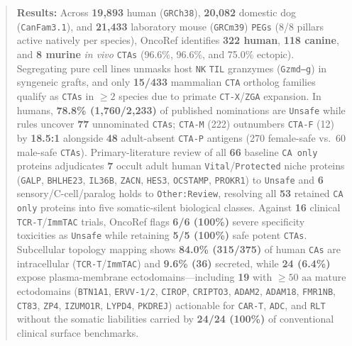 \documentclass[10pt,letterpaper]{article}
\begin{document}
\begin{abstract}
\textbf{Results:} Across \textbf{19,893} human (\texttt{GRCh38}), \textbf{20,082} domestic dog (\texttt{CanFam3.1}), and \textbf{21,433} laboratory mouse (\texttt{GRCm39}) \texttt{PEGs} (8/8 pillars active natively per species), OncoRef identifies \textbf{322 human}, \textbf{118 canine}, and \textbf{8 murine} \emph{in vivo} \texttt{CTAs} (96.6\%, 96.6\%, and 75.0\% ectopic). Segregating pure cell lines unmasks host \texttt{NK} \texttt{TIL} granzymes (\texttt{Gzmd--g}) in syngeneic grafts, and only \textbf{15/433} mammalian \texttt{CTA} ortholog families qualify as \texttt{CTAs} in $\ge 2$ species due to primate \texttt{CT-X}/\texttt{ZGA} expansion. In humans, \textbf{78.8\% (1,760/2,233)} of published nominations are \texttt{Unsafe} while rules uncover \textbf{77} unnominated \texttt{CTAs}; \texttt{CTA-M} (222) outnumbers \texttt{CTA-F} (12) by \textbf{18.5:1} alongside \textbf{48} adult-absent \texttt{CTA-P} antigens (270 female-safe vs.\ 60 male-safe \texttt{CTAs}). Primary-literature review of all \textbf{66} baseline \texttt{CA only} proteins adjudicates \textbf{7} occult adult human \texttt{Vital}/\texttt{Protected} niche proteins (\texttt{GALP}, \texttt{BHLHE23}, \texttt{IL36B}, \texttt{ZACN}, \texttt{HES3}, \texttt{OCSTAMP}, \texttt{PROKR1}) to \texttt{Unsafe} and \textbf{6} sensory/C-cell/paralog holds to \texttt{Other:Review}, resolving all \textbf{53} retained \texttt{CA only} proteins into five somatic-silent biological classes. Against \textbf{16} clinical \texttt{TCR-T}/\texttt{ImmTAC} trials, OncoRef flags \textbf{6/6 (100\%)} severe specificity toxicities as \texttt{Unsafe} while retaining \textbf{5/5 (100\%)} safe potent \texttt{CTAs}. Subcellular topology mapping shows \textbf{84.0\% (315/375)} of human \texttt{CAs} are intracellular (\texttt{TCR-T}/\texttt{ImmTAC}) and \textbf{9.6\% (36)} secreted, while \textbf{24 (6.4\%)} expose plasma-membrane ectodomains---including \textbf{19} with $\ge 50\text{ aa}$ mature ectodomains (\texttt{BTN1A1}, \texttt{ERVV-1/2}, \texttt{CIROP}, \texttt{CRIPTO3}, \texttt{ADAM2}, \texttt{ADAM18}, \texttt{FMR1NB}, \texttt{CT83}, \texttt{ZP4}, \texttt{IZUMO1R}, \texttt{LYPD4}, \texttt{PKDREJ}) actionable for \texttt{CAR-T}, \texttt{ADC}, and \texttt{RLT} without the somatic liabilities carried by \textbf{24/24 (100\%)} of conventional clinical surface benchmarks.
\end{abstract}
\end{document}
